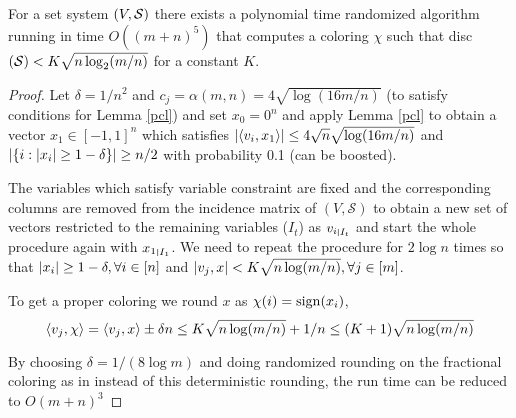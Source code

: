 \begin{theorem}
For a set system $\left(V,\mathcal{S} \right )$ there exists a polynomial time randomized algorithm running in time $O((m+n)^5)$ that computes a coloring $\chi$ such that disc$\left(\mathcal{S} \right ) < K\sqrt{n\log_2(m/n)}$ for a constant $K$.
\end{theorem}
\begin{proof}
Let $\delta = 1/n^2$ and $c_j = \alpha(m,n) = 4 \sqrt{\log(16m/n)}$ (to satisfy conditions for Lemma \ref{pcl}) and set $x_0 =0^n$ and apply Lemma \ref{pcl} to obtain a vector $x_1 \in [-1,1]^n$ which satisfies
$\left\lvert \left\langle v_i,x_1\right\rangle \right\rvert \leq 4\sqrt{n}\sqrt{\log(16m/n)}$ and $\left\lvert \left\{i: \left\lvert x_i \right\rvert \geq 1 - \delta\right\} \right\rvert \geq n/2$ with probability 0.1 (can be boosted).\par
The variables which satisfy variable constraint are fixed and the corresponding columns are removed from the incidence matrix of $(V,\mathcal{S})$ to obtain a new set of vectors restricted to the remaining variables ($I_t$) as ${v_i}_{\mkern 1mu \vrule height 1ex\mkern2mu {I_t}}$ and start the whole procedure again with ${x_1}_{\mkern 1mu \vrule height 1ex\mkern2mu {I_1}}$.
We need to repeat the procedure for $2\log n$ times so that $\left\lvert x_i \right\rvert \geq 1- \delta, \forall i \in [n]$ and $\left\lvert v_j,x \right\rvert < K\sqrt{n\log(m/n)}, \forall j \in [m]$.

To get a proper coloring we round $x$ as $\chi(i) = \operatorname{sign}(x_i) $,
\[ \left\langle v_j,\chi\right\rangle = \left\langle v_j,x\right\rangle \pm \delta n \leq K\sqrt{n\log(m/n)} + 1/n \leq (K+1)\sqrt{n\log(m/n)} \]

By choosing $\delta = 1/(8 \log m)$ and doing randomized rounding on the fractional coloring as in \cite{12lovettmeka} instead of this deterministic rounding, the run time can be reduced to $O(m+n)^3$
\end{proof}
